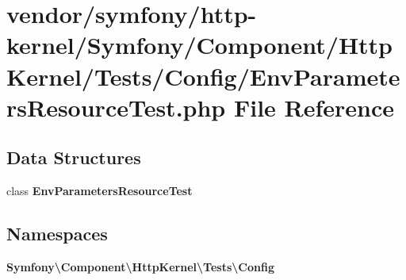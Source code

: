 \section{vendor/symfony/http-\/kernel/\+Symfony/\+Component/\+Http\+Kernel/\+Tests/\+Config/\+Env\+Parameters\+Resource\+Test.php File Reference}
\label{_env_parameters_resource_test_8php}
\subsection*{Data Structures}
\begin{DoxyCompactItemize}
\item 
class {\bf Env\+Parameters\+Resource\+Test}
\end{DoxyCompactItemize}
\subsection*{Namespaces}
\begin{DoxyCompactItemize}
\item 
 {\bf Symfony\textbackslash{}\+Component\textbackslash{}\+Http\+Kernel\textbackslash{}\+Tests\textbackslash{}\+Config}
\end{DoxyCompactItemize}
